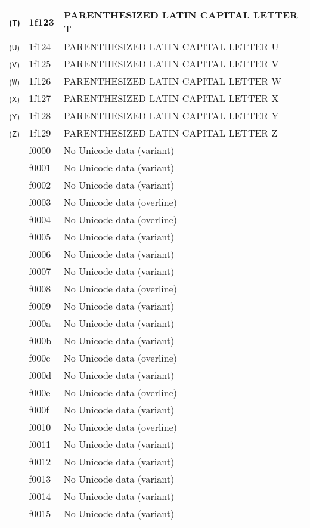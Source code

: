 \documentclass[12pt,letterpaper,openany]{book}
\begin{document}
\begin{center}
\begin{supertabular}{|m{0.25in}|m{0.5in}|m{4in}|}
			🄣 & 1f123 & PARENTHESIZED LATIN CAPITAL LETTER T\\\hline
			🄤 & 1f124 & PARENTHESIZED LATIN CAPITAL LETTER U\\\hline
			🄥 & 1f125 & PARENTHESIZED LATIN CAPITAL LETTER V\\\hline
			🄦 & 1f126 & PARENTHESIZED LATIN CAPITAL LETTER W\\\hline
			🄧 & 1f127 & PARENTHESIZED LATIN CAPITAL LETTER X\\\hline
			🄨 & 1f128 & PARENTHESIZED LATIN CAPITAL LETTER Y\\\hline
			🄩 & 1f129 & PARENTHESIZED LATIN CAPITAL LETTER Z\\\hline
			󰀀 & f0000 & No Unicode data (variant)\\\hline
			󰀁 & f0001 & No Unicode data (variant)\\\hline
			󰀂 & f0002 & No Unicode data (variant)\\\hline
			󰀃 & f0003 & No Unicode data (overline)\\\hline
			󰀄 & f0004 & No Unicode data (overline)\\\hline
			󰀅 & f0005 & No Unicode data (variant)\\\hline
			󰀆 & f0006 & No Unicode data (variant)\\\hline
			󰀇 & f0007 & No Unicode data (variant)\\\hline
			󰀈 & f0008 & No Unicode data (overline)\\\hline
			󰀉 & f0009 & No Unicode data (variant)\\\hline
			󰀊 & f000a & No Unicode data (variant)\\\hline
			󰀋 & f000b & No Unicode data (variant)\\\hline
			󰀌 & f000c & No Unicode data (overline)\\\hline
			󰀍 & f000d & No Unicode data (variant)\\\hline
			󰀎 & f000e & No Unicode data (overline)\\\hline
			󰀏 & f000f & No Unicode data (variant)\\\hline
			󰀐 & f0010 & No Unicode data (overline)\\\hline
			󰀑 & f0011 & No Unicode data (variant)\\\hline
			󰀒 & f0012 & No Unicode data (variant)\\\hline
			󰀓 & f0013 & No Unicode data (variant)\\\hline
			󰀔 & f0014 & No Unicode data (variant)\\\hline
			󰀕 & f0015 & No Unicode data (variant)\\\hline

\end{supertabular}
\end{center}
\end{document}
